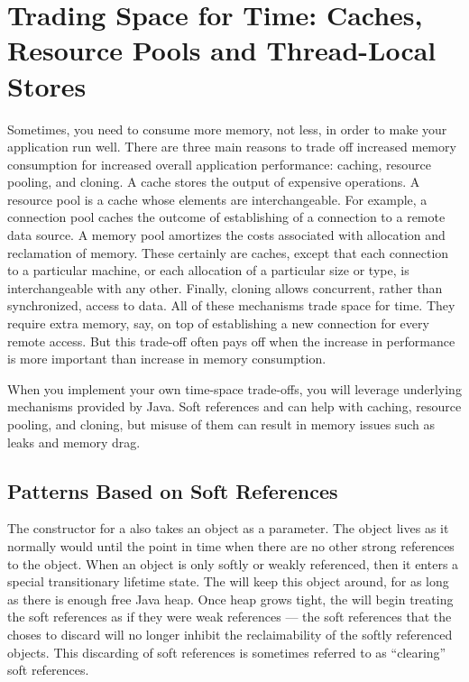 \chapter[Trading Space for Time]{Trading Space for Time: Caches, Resource Pools and Thread-Local
Stores}
\label{chapter:trading-space-for-time}

Sometimes, you need to consume more memory, not less, in order to make your
application run well. There are three main reasons to trade off increased memory
consumption for increased overall application performance: caching, resource
pooling, and cloning. A cache stores the output of expensive operations. A
resource pool is a cache whose elements are interchangeable. For example, a
connection pool caches the outcome of establishing of a connection to a remote
data source. A memory pool amortizes the costs associated with allocation and
reclamation of memory. These certainly are caches, except that each connection
to a particular machine, or each allocation of a particular size or type, is
interchangeable with any other. Finally, cloning allows concurrent, rather than
synchronized, access to data. All of these mechanisms trade space for time. They
require extra memory, say, on top of establishing a new connection for every
remote access. But this trade-off often pays off when the increase in
performance is more important than increase in memory consumption.

When you implement your own time-space trade-offs, you will leverage underlying
mechanisms provided by Java. Soft references and \tls can help with caching,
resource pooling, and cloning, but misuse of them can result in memory issues
such as leaks and memory drag.


\section{Patterns Based on Soft References}

The constructor for a  also takes an object as a parameter.
The object lives as it normally would until the point in time when there are no
other strong references to the object. When an object is only softly or weakly
referenced, then it enters a special transitionary lifetime state. The \jre will
keep this object around, for as long as there is enough free Java heap. Once heap
grows tight, the \jre will begin treating the soft references as if they were
weak references --- the soft references that the \jre choses to discard will no
longer inhibit the reclaimability of the softly referenced objects. This
discarding of soft references is sometimes referred to as ``clearing'' soft
references.

